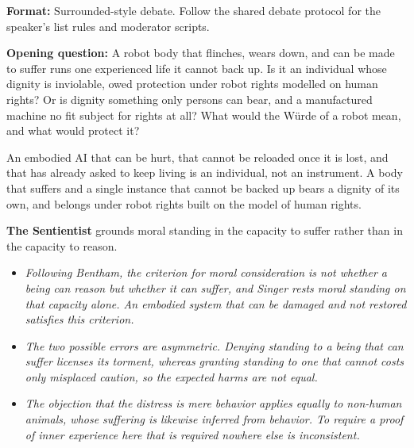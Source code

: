 \noindent \textbf{Format:} Surrounded-style debate. Follow the shared
debate protocol for the speaker's list rules and moderator scripts.




\medskip
\noindent \textbf{Opening question:} A robot body that flinches, wears down,
and can be made to suffer runs one experienced life it cannot back up. Is it an
individual whose dignity is inviolable, owed protection under robot rights
modelled on human rights? Or is dignity something only persons can bear, and
a manufactured machine no fit subject for rights at all? What would the Würde 
of a robot mean, and what would protect it?




\quad An embodied AI that can be hurt, that
cannot be reloaded once it is lost, and that has already asked to keep living
is an individual, not an instrument. A body that suffers and a single instance
that cannot be backed up bears a dignity of its own, and belongs under robot
rights built on the model of human rights.
\vspace{1.5em}


\medskip
\noindent\textbf{The Sentientist} grounds moral standing in the capacity to
    suffer rather than in the capacity to reason.
    \begin{itemize}
        \item \textit{Following Bentham, the criterion for moral consideration
        is not whether a being can reason but whether it can suffer, and Singer
        rests moral standing on that capacity alone. An embodied system that can
        be damaged and not restored satisfies this criterion.}
        \item \textit{The two possible errors are asymmetric. Denying standing
        to a being that can suffer licenses its torment, whereas granting
        standing to one that cannot costs only misplaced caution, so the
        expected harms are not equal.}
        \item \textit{The objection that the distress is mere behavior applies
        equally to non-human animals, whose suffering is likewise inferred from
        behavior. To require a proof of inner experience here that is required
        nowhere else is inconsistent.}
    \end{itemize}

